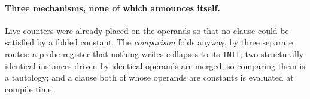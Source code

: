 \begin{table}[htbp]\centering\footnotesize 
{}
\caption{Clause census over the seven on-die wrappers, from
\texttt{measurements/\allowbreak clauses\_\allowbreak w983.json}. Half of the assertions that the
published verdicts rested on were constants at synthesis time.}
\label{tab:clauses}
\end{table}


\paragraph{Three mechanisms, none of which announces itself.} Live counters were
already placed on the operands so that no clause could be satisfied by a folded
constant. The \emph{comparison} folds anyway, by three separate routes: a probe
register that nothing writes collapses to its \texttt{INIT}; two structurally
identical instances driven by identical operands are merged, so comparing them
is a tautology; and a clause both of whose operands are constants is evaluated
at compile time.

